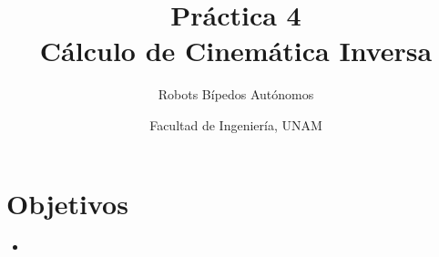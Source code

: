 \documentclass[letterpaper,12pt]{article}
\title{Práctica 4 \\ Cálculo de Cinemática Inversa}
\author{Robots Bípedos Autónomos}
\date{Facultad de Ingeniería, UNAM}
\begin{document}
\renewcommand{\tablename}{Tabla}
\maketitle
\section*{Objetivos}
\begin{itemize}
\item 
\end{itemize}
\end{document}
